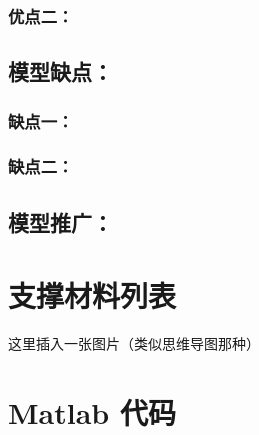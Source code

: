 \documentclass[zihao=-4, UTF8]{article}		%
\theoremstyle{MyLineTheoremStyle} %
\theoremstyle{MyBlockTheoremStyle} %
\theoremstyle{MySubsubsectionStyle} %
\begin{document}
\subsubsection{优点二：}
\subsection{模型缺点：}
\subsubsection{缺点一：}
\subsubsection{缺点二：}
\subsection{模型推广：}

\nocite{*}



\newpage
\appendix
{}
\titleformat{\subsection}{\normalsize\bfseries}{\thesubsection}{1em}{}

\section{支撑材料列表}
\begin{center}
  这里插入一张图片（类似思维导图那种）
\end{center}
\section{Matlab 代码}
\end{document}
